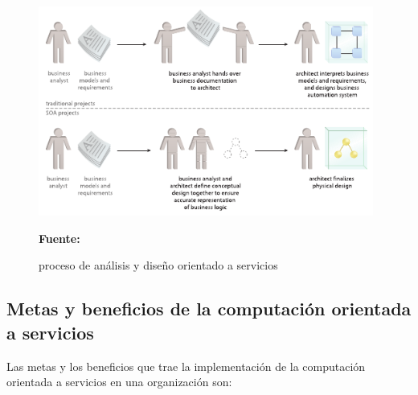 \begin{figure}[!htb]
  \begin{center}
    \includegraphics[width=11cm]{./imagenes/6.png}
    \caption{proceso de análisis y diseño orientado a servicios}
    \label{fig:seis}
    \textbf{Fuente:}  \cite{soa_principles}
  \end{center}
\end{figure}

\subsection{Metas y beneficios de la computación orientada a servicios }

Las metas y los beneficios que trae la implementación de la computación orientada a servicios en una organización son:

